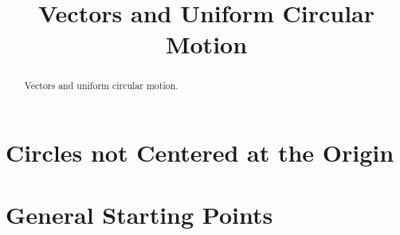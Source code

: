 \documentclass{ximera}
\title{Vectors and Uniform Circular Motion}
\begin{document}
\begin{abstract}
Vectors and uniform circular motion.
\end{abstract}
\maketitle

\section{Circles not Centered at the Origin}




\section{General Starting Points}
\end{document}
